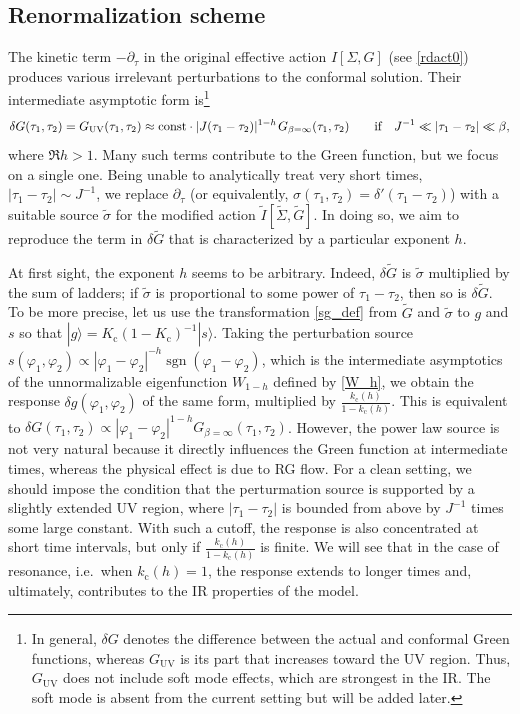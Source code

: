 \documentclass[12pt]{article}
\newcommand*{\kett}[1]{|{#1}\rangle}
\DeclareMathOperator{\sgn}{sgn}
\newcommand{\const}{\mathrm{const}}
\newcommand{\cc}{\mathrm{c}}
\newcommand{\UV}{\text{UV}}
\newcommand{\tI}{\tilde{I}}
\newcommand{\tG}{\widetilde{G}}
\newcommand{\tSig}{\widetilde{\Sigma}}
\newcommand{\tsig}{\tilde{\sigma}}
\newcommand{\vp}{\varphi}
\def\ie{i.e.\ }
\begin{document}
\subsection{Renormalization scheme}\label{sec_renorm1}

The kinetic term $-\partial_\tau$ in the original effective action $I[\Sigma,G]$ (see \eqref{rdact0}) produces various irrelevant perturbations to the conformal solution. Their intermediate asymptotic form is\footnote{In general, $\delta G$ denotes the difference between the actual and conformal Green functions, whereas $G_{\UV}$ is its part that increases toward the UV region. Thus, $G_{\UV}$ does not include soft mode effects, which are strongest in the IR. The soft mode is absent from the current setting but will be added later.}
\begin{equation}
\delta G(\tau_1,\tau_2)=G_{\UV}(\tau_1,\tau_2)
\approx\const\cdot
|J(\tau_1-\tau_2)|^{1-h}\kern1pt G_{\beta=\infty}(\tau_1,\tau_2)
\qquad\text{if}\quad J^{-1}\ll |\tau_1-\tau_2|\ll \beta,
\end{equation}
where $\Re h>1$. Many such terms contribute to the Green function, but we focus on a single one. Being unable to analytically treat very short times, $|\tau_1-\tau_2|\sim J^{-1}$, we replace $\partial_\tau$ (or equivalently, $\sigma(\tau_1,\tau_2)=\delta'(\tau_1-\tau_2)$) with a suitable source $\tsig$ for the modified action $\tI[\tSig,\tG]$. In doing so, we aim to reproduce the term in $\delta\tG$ that is characterized by a particular exponent $h$.

At first sight, the exponent $h$ seems to be arbitrary. Indeed, $\delta\tG$ is $\tsig$ multiplied by the sum of ladders; if $\tsig$ is proportional to some power of $\tau_1-\tau_2$, then so is $\delta\tG$. To be more precise, let us use the transformation \eqref{sg_def} from $\tG$ and $\tsig$ to $g$ and $s$ so that $\kett{g}=K_{\cc}(1-K_{\cc})^{-1}\kett{s}$. Taking the perturbation source $s(\vp_1,\vp_2)\propto {|\vp_1-\vp_2|^{-h}\sgn(\vp_1-\vp_2)}$, which is the intermediate asymptotics of the unnormalizable eigenfunction $W_{1-h}$ defined by \eqref{W_h}, we obtain the response $\delta g(\vp_1,\vp_2)$ of the same form, multiplied by $\frac{k_{\cc}(h)}{1-k_{\cc}(h)}$. This is equivalent to $\delta G(\tau_1,\tau_2)\propto |\vp_1-\vp_2|^{1-h}G_{\beta=\infty}(\tau_1,\tau_2)$. However, the power law source is not very natural because it directly influences the Green function at intermediate times, whereas the physical effect is due to RG flow. For a clean setting, we should impose the condition that the perturmation source is supported by a slightly extended UV region, where $|\tau_1-\tau_2|$ is bounded from above by $J^{-1}$ times some large constant. With such a cutoff, the response is also concentrated at short time intervals, but only if $\frac{k_{\cc}(h)}{1-k_{\cc}(h)}$ is finite. We will see that in the case of resonance, \ie when $k_{\cc}(h)=1$, the response extends to longer times and, ultimately, contributes to the IR properties of the model.
\end{document}
